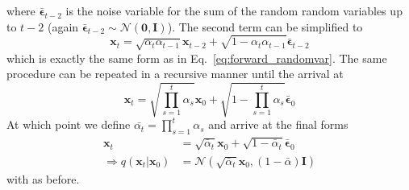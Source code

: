where $\bm{\bar{\epsilon}}_{t-2}$ is the noise variable for the sum of the random random variables up to $t-2$ (again $\bm{\bar{\epsilon}}_{t-2} \sim \mathcal{N}(\bm{0}, \bm{I})$). The second term can be simplified to
\begin{equation}
    \bm{x}_t = \sqrt{\alpha_{t}\alpha_{t-1}} \bm{x}_{t-2} + \sqrt{1-\alpha_t\alpha_{t-1}} \bm{\bar{\epsilon}}_{t-2}
\end{equation}
which is exactly the same form as in Eq.~\ref{eq:forward_randomvar}. The same procedure can be repeated in a recursive manner until the arrival at
\begin{equation}
    \bm{x}_t = \sqrt{\prod_{s=1}^{t}\alpha_s} \bm{x}_{0} + \sqrt{1-\prod_{s=1}^{t}\alpha_s} \bm{\bar{\epsilon}}_{0}
\end{equation}
At which point we define $\bar{\alpha_t} = \prod_{s=1}^{t}\alpha_s$ and arrive at the final forms
\begin{align}
    \bm{x}_t                           & = \sqrt{\bar{\alpha}_{t}} \bm{x}_{0} + \sqrt{1-\bar{\alpha}_{t}} \bm{\bar{\epsilon}}_{0} \\
    \Rightarrow q(\bm{x}_t|\bm{x}_{0}) & = \mathcal{N}(\sqrt{\bar{\alpha}_t} \bm{x}_{0}, (1-\bar{\alpha}) \bm{I})
\end{align}
with  as before.

